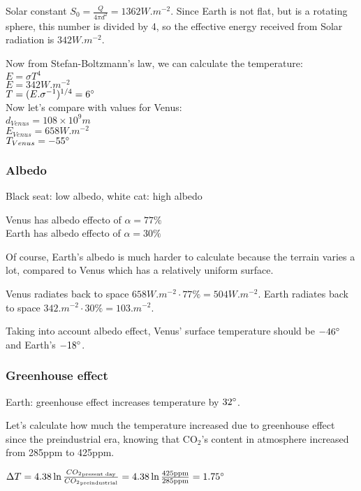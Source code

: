 Solar constant $S_0 = \frac{Q}{4\pi d^2} = 1362W.m^{-2}$. Since Earth is not
flat, but is a rotating sphere, this number is divided by 4, so the effective
energy received from Solar radiation is $342W.m^{-2}$.

Now from Stefan-Boltzmann's law, we can calculate the temperature:\\
$E = \sigma T^{4}$\\
$E = 342W.m^{-2}$\\
$T = (E.\sigma^{-1})^{1/4} = 6 \degree$\\

Now let's compare with values for Venus:\\
$d_{Venus} = 108 \times 10^9m$\\
$E_{Venus} = 658W.m^{-2}$\\
$T_{Venus} = -55 \degree$\\

\subsubsection*{Albedo}
Black seat: low albedo, white cat: high albedo

Venus has albedo effecto of $\alpha = 77\%$\\ 
Earth has albedo effecto of $\alpha = 30\%$

Of course, Earth's albedo is much harder to calculate because the terrain
varies a lot, compared to Venus which has a relatively uniform surface.

Venus radiates back to space $658W.m^{-2} \cdot 77\% = 504W.m^{-2}$.
Earth radiates back to space $342.m^{-2} \cdot 30\% = 103.m^{-2}$.

Taking into account albedo effect, Venus' surface temperature should be
$-46 \degree$ and Earth's $-18 \degree$.

\subsubsection*{Greenhouse effect}

Earth: greenhouse effect increases temperature by $32 \degree$.

Let's calculate how much the temperature increased due to greenhouse effect
since the preindustrial era, knowing that CO$_2$'s content in atmosphere
increased from 285ppm to 425ppm.

$\Delta T = 4.38 \ln \frac{{CO_2}_\text{present day}}
{{CO_2}_\text{preindustrial}} =
4.38 \ln \frac{425 \text{ppm}}{285 \text{ppm}} = 1.75 \degree$

